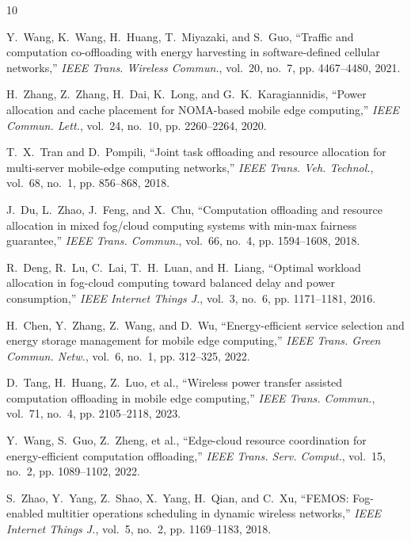 \documentclass[lettersize,journal]{IEEEtran}
\begin{document}
\begin{thebibliography}{10}


Y.~Wang, K.~Wang, H.~Huang, T.~Miyazaki, and S.~Guo, ``Traffic and computation co-offloading with energy harvesting in software-defined cellular networks,'' \emph{IEEE Trans. Wireless Commun.}, vol.~20, no.~7, pp. 4467--4480, 2021.

H.~Zhang, Z.~Zhang, H.~Dai, K.~Long, and G.~K.~Karagiannidis, ``Power allocation and cache placement for NOMA-based mobile edge computing,'' \emph{IEEE Commun. Lett.}, vol.~24, no.~10, pp. 2260--2264, 2020.

T.~X.~Tran and D.~Pompili, ``Joint task offloading and resource allocation for multi-server mobile-edge computing networks,'' \emph{IEEE Trans. Veh. Technol.}, vol.~68, no.~1, pp. 856--868, 2018.

J.~Du, L.~Zhao, J.~Feng, and X.~Chu, ``Computation offloading and resource allocation in mixed fog/cloud computing systems with min-max fairness guarantee,'' \emph{IEEE Trans. Commun.}, vol.~66, no.~4, pp. 1594--1608, 2018.

R.~Deng, R.~Lu, C.~Lai, T.~H.~Luan, and H.~Liang, ``Optimal workload allocation in fog-cloud computing toward balanced delay and power consumption,'' \emph{IEEE Internet Things J.}, vol.~3, no.~6, pp. 1171--1181, 2016.

H.~Chen, Y.~Zhang, Z.~Wang, and D.~Wu, ``Energy-efficient service selection and energy storage management for mobile edge computing,'' \emph{IEEE Trans. Green Commun. Netw.}, vol.~6, no.~1, pp. 312--325, 2022.

D.~Tang, H.~Huang, Z.~Luo, et al., ``Wireless power transfer assisted computation offloading in mobile edge computing,'' \emph{IEEE Trans. Commun.}, vol.~71, no.~4, pp. 2105--2118, 2023.

Y.~Wang, S.~Guo, Z.~Zheng, et al., ``Edge-cloud resource coordination for energy-efficient computation offloading,'' \emph{IEEE Trans. Serv. Comput.}, vol.~15, no.~2, pp. 1089--1102, 2022.

S.~Zhao, Y.~Yang, Z.~Shao, X.~Yang, H.~Qian, and C.~Xu, ``FEMOS: Fog-enabled multitier operations scheduling in dynamic wireless networks,'' \emph{IEEE Internet Things J.}, vol.~5, no.~2, pp. 1169--1183, 2018.


\end{thebibliography}
\end{document}
